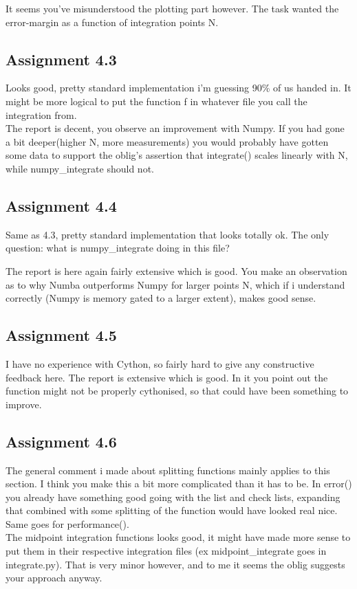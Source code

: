 \documentclass[a4paper]{article}
\begin{document}
It seems you've misunderstood the plotting part however. The task wanted the error-margin as a function of integration points N. 


\subsection*{Assignment 4.3}
Looks good, pretty standard implementation i'm guessing 90\% of us handed in. It might be more logical to put the function f in whatever file you call the integration from.\\[1\baselineskip] 
\noindent The report is decent, you observe an improvement with Numpy. If you had gone a bit deeper(higher N, more measurements) you would probably have gotten some data to support the oblig's assertion that integrate() scales linearly with N, while numpy\_integrate should not.

\subsection*{Assignment 4.4}
Same as 4.3, pretty standard implementation that looks totally ok. The only question: what is numpy\_integrate doing in this file?

\noindent The report is here again fairly extensive which is good. You make an observation as to why Numba outperforms Numpy for larger points N, which if i understand correctly (Numpy is memory gated to a larger extent), makes good sense.

\subsection*{Assignment 4.5}
I have no experience with Cython, so fairly hard to give any constructive feedback here. The report is extensive which is good. In it you point out the function might not be properly cythonised, so that could have been something to improve.

\subsection*{Assignment 4.6}
The general comment i made about splitting functions mainly applies to this section. I think you make this a bit more complicated than it has to be. In error() you already have something good going with the list and check lists, expanding that combined with some splitting of the function would have looked real nice. Same goes for performance().\\[1\baselineskip] 
The midpoint integration functions looks good, it might have made more sense to put them in their respective integration files (ex midpoint\_integrate goes in integrate.py). That is very minor however, and to me it seems the oblig suggests your approach anyway.
\end{document}

